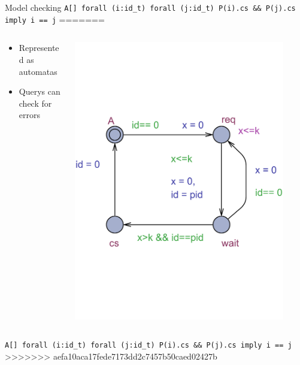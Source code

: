 \begin{frame}[t]{Model checking}
		{
            \texttt{A[] forall (i:id\_t) forall (j:id\_t) P(i).cs \&\& P(j).cs imply i == j}
		}
=======
	\begin{columns}[T]
		\begin{column}{.48\textwidth}
			\begin{itemize}
				\item Represented as automatas
				\item Querys can check for errors
			\end{itemize}
		\end{column}
		\begin{column}{.48\textwidth}
			\includegraphics[trim=0 200 0 200,width=0.90\textwidth]{images/P.pdf}
		\end{column}
	\end{columns}
	\medskip
	\texttt{A[] forall (i:id\_t) forall (j:id\_t) P(i).cs \&\& P(j).cs imply i == j}
>>>>>>> aefa10aca17fede7173dd2c7457b50caed02427b
\end{frame}

